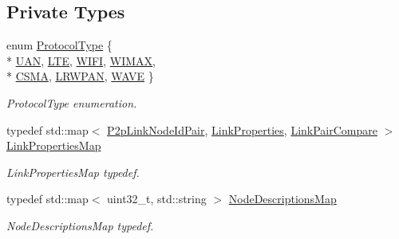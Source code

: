 \subsection*{Private Types}
\begin{DoxyCompactItemize}
\item 
enum \hyperlink{classns3_1_1AnimationInterface_a801a4efd553ff0d1d768cd70d22456b6}{Protocol\+Type} \{ \\*
\hyperlink{classns3_1_1AnimationInterface_a801a4efd553ff0d1d768cd70d22456b6a930e85d5c281228df80c06e2aa921e2c}{U\+AN}, 
\hyperlink{classns3_1_1AnimationInterface_a801a4efd553ff0d1d768cd70d22456b6a8a686aad98ab0f637f9e8ff674672d0a}{L\+TE}, 
\hyperlink{classns3_1_1AnimationInterface_a801a4efd553ff0d1d768cd70d22456b6afc37c88b12f1b26ee565dac2536d0bb5}{W\+I\+FI}, 
\hyperlink{classns3_1_1AnimationInterface_a801a4efd553ff0d1d768cd70d22456b6a1efe3945a884415af2a55f40b35848cd}{W\+I\+M\+AX}, 
\\*
\hyperlink{classns3_1_1AnimationInterface_a801a4efd553ff0d1d768cd70d22456b6a5fb0f9f61327638f165213b90492cfa7}{C\+S\+MA}, 
\hyperlink{classns3_1_1AnimationInterface_a801a4efd553ff0d1d768cd70d22456b6a6356c745a7c48e2f8789f87a4f90da89}{L\+R\+W\+P\+AN}, 
\hyperlink{classns3_1_1AnimationInterface_a801a4efd553ff0d1d768cd70d22456b6a090868db2e88c7d4d576d145ef25ab93}{W\+A\+VE}
 \}\begin{DoxyCompactList}\small\item\em Protocol\+Type enumeration. \end{DoxyCompactList}
\item 
typedef std\+::map$<$ \hyperlink{structns3_1_1AnimationInterface_1_1P2pLinkNodeIdPair}{P2p\+Link\+Node\+Id\+Pair}, \hyperlink{structns3_1_1AnimationInterface_1_1LinkProperties}{Link\+Properties}, \hyperlink{structns3_1_1AnimationInterface_1_1LinkPairCompare}{Link\+Pair\+Compare} $>$ \hyperlink{classns3_1_1AnimationInterface_a6b801c7635367ab676b45b476ea3902c}{Link\+Properties\+Map}
\begin{DoxyCompactList}\small\item\em Link\+Properties\+Map typedef. \end{DoxyCompactList}\item 
typedef std\+::map$<$ uint32\+\_\+t, std\+::string $>$ \hyperlink{classns3_1_1AnimationInterface_a493cca9d5a60ca9be9ffd26c57f94d34}{Node\+Descriptions\+Map}
\begin{DoxyCompactList}\small\item\em Node\+Descriptions\+Map typedef. \end{DoxyCompactList}\item 

\end{DoxyCompactItemize}

